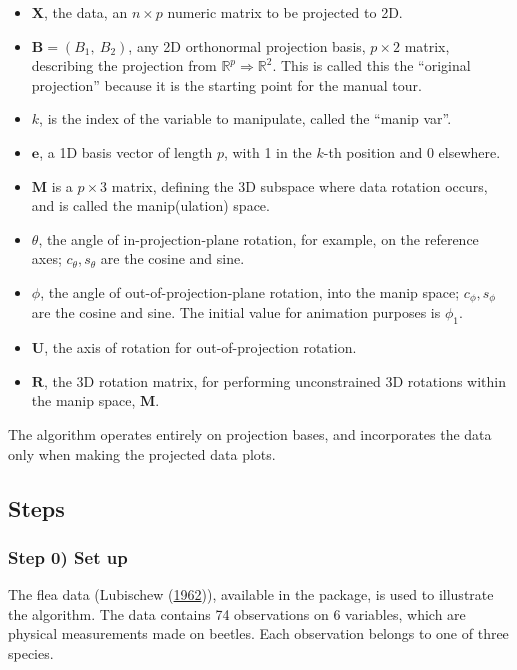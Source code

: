 \begin{itemize}
\tightlist
\item
  \(\textbf{X}\), the data, an \(n \times p\) numeric matrix to be
  projected to 2D.
\item
  \(\textbf{B} = (B_1,~ B_2)\), any 2D orthonormal projection basis,
  \(p \times 2\) matrix, describing the projection from
  \(\mathbb{R}^p \Rightarrow \mathbb{R}^2\). This is called this the
  ``original projection'' because it is the starting point for the
  manual tour.
\item
  \(k\), is the index of the variable to manipulate, called the ``manip
  var''. 
\item
  \(\textbf{e}\), a 1D basis vector of length \(p\), with 1 in the
  \(k\)-th position and 0 elsewhere.
\item
  \(\textbf{M}\) is a \(p \times 3\) matrix, defining the 3D subspace
  where data rotation occurs, and is called the manip(ulation) space.
\item
  \(\theta\), the angle of in-projection-plane rotation, for example, on
  the reference axes; \(c_\theta, s_\theta\) are the cosine and sine.
\item
  \(\phi\), the angle of out-of-projection-plane rotation, into the
  manip space; \(c_\phi, s_\phi\) are the cosine and sine. The initial
  value for animation purposes is \(\phi_1\).
\item
  \(\textbf{U}\), the axis of rotation for out-of-projection rotation.
\item
  \(\textbf{R}\), the 3D rotation matrix, for performing unconstrained
  3D rotations within the manip space, \(\textbf{M}\). 
\end{itemize}

The algorithm operates entirely on projection bases, and incorporates
the data only when making the projected data plots.

\hypertarget{steps}{%
\subsection{Steps}\label{steps}}

\hypertarget{step-0-set-up}{%
\subsubsection{Step 0) Set up}\label{step-0-set-up}}

The flea data (Lubischew
(\protect\hyperlink{ref-lubischew_use_1962}{1962})), available in the
 package, is used to illustrate the algorithm. The data
contains 74 observations on 6 variables, which are physical measurements
made on beetles. Each observation belongs to one of three species.

